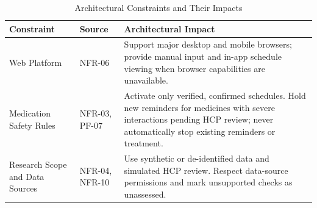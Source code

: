 \begin{table}[!htbp]
\centering
\caption{Architectural Constraints and Their Impacts}
\label{tab:architectural-constraints}

\begin{tabularx}{\textwidth}{|L{3cm}|L{2cm}|Y|}
\hline
\textbf{Constraint} & \textbf{Source} &
\textbf{Architectural Impact} \\ \hline

Web Platform & NFR-06 &
Support major desktop and mobile browsers;
provide manual input and in-app schedule viewing
when browser capabilities are unavailable.
\\ \hline

Medication Safety Rules & NFR-03, PF-07 &
Activate only verified, confirmed schedules.
Hold new reminders for medicines with severe
interactions pending HCP review; never
automatically stop existing reminders or treatment.
\\ \hline

Research Scope and Data Sources & NFR-04, NFR-10 &
Use synthetic or de-identified data and simulated HCP
review. Respect data-source permissions and
mark unsupported checks as unassessed.
\\ \hline

\end{tabularx}
\end{table}

\clearpage
